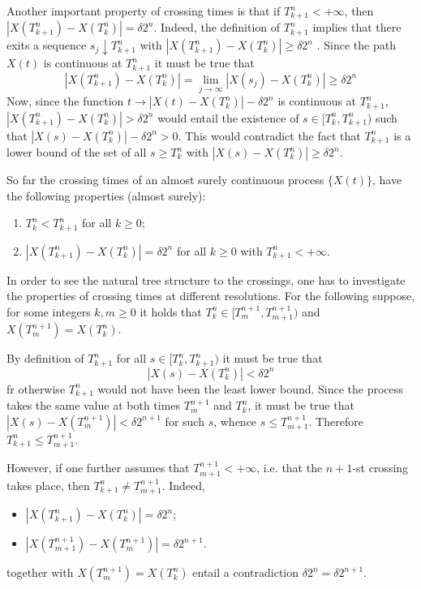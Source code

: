 Another important property of crossing times is that if $T_{k+1}^n < +\infty$, then
$|X(T_{k+1}^n)-X(T_k^n)| = \delta 2^n$. Indeed, the definition of $T_{k+1}^n$ implies
that there exits a sequence $s_j\downarrow T_{k+1}^n$ with $|X(T_{k+1}^n)-X(T_k^n)|\geq \delta 2^n$
. Since the path $X(t)$ is continuous at $T_{k+1}^n$ it must be true that
\[
|X(T_{k+1}^n)-X(T_k^n)| = \lim_{j\to \infty} |X(s_j)-X(T_k^n)| \geq \delta 2^n
\]
Now, since the function $t\to |X(t)-X(T_k^n)| - \delta 2^n$ is continuous at $T_{k+1}^n$,
$|X(T_{k+1}^n)-X(T_k^n)| > \delta 2^n$ would entail the existence of $s\in [T_k^n, T_{k+1}^n)$
such that $|X(s)-X(T_k^n)| - \delta 2^n > 0$. This would contradict the fact that
$T_{k+1}^n$ is a lower bound of the set of all $s\geq T_k^n$ with $|X(s)-X(T_k^n)| \geq \delta 2^n$.

So far the crossing times of an almost surely continuous process $\{X(t)\}$, have
the following properties (almost surely): \begin{enumerate}
	\item $T_k^n < T_{k+1}^n$ for all $k\geq 0$;
	\item $|X(T_{k+1}^n)-X(T_k^n)| = \delta 2^n$ for all $k\geq0$ with $T_{k+1}^n<+\infty$.
\end{enumerate}

In order to see the natural tree structure to the crossings, one has to investigate
the properties of crossing times at different resolutions. For the following suppose,
for some integers $k,m\geq 0$ it holds that $T_k^n\in [T_m^{n+1}, T_{m+1}^{n+1})$ and
$X(T_m^{n+1}) = X(T_k^n)$.

By definition of $T_{k+1}^n$ for all $s\in[T_k^n, T_{k+1}^n)$ it must be true that
\[ |X(s) - X(T_k^n)| < \delta 2^n \]
fr otherwise $T_{k+1}^n$ would not have been the least lower bound. Since the process
takes the same value at both times $T_m^{n+1}$ and $T_k^n$, it must be true that
$|X(s) - X(T_m^{n+1})| < \delta 2^{n+1}$ for such $s$, whence $s\leq T_{m+1}^{n+1}$.
Therefore $T_{k+1}^n\leq T_{m+1}^{n+1}$.

However, if one further assumes that $T_{m+1}^{n+1} < +\infty$, i.e. that the $n+1$-st
crossing takes place, then $T_{k+1}^n \neq T_{m+1}^{n+1}$. Indeed, \begin{itemize}
	\item $|X(T_{k+1}^n)-X(T_k^n)| = \delta 2^n$;
	\item $|X(T_{m+1}^{n+1})-X(T_m^{n+1})| = \delta 2^{n+1}$.
\end{itemize}
together with $X(T_m^{n+1}) = X(T_k^n)$ entail a contradiction $\delta 2^n = \delta 2^{n+1}$.

